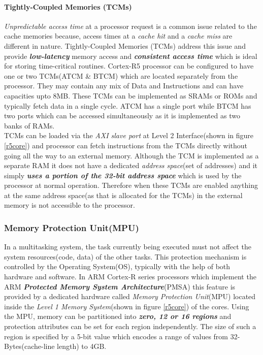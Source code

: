 \documentclass[a4paper,11pt]{article}
\begin{document}
\paragraph{Tightly-Coupled Memories (TCMs)}  \textit{Unpredictable access time} at a processor request is a common issue related to the cache memories because, access times at a \textit{cache hit} and a \textit{cache miss} are different in nature. Tightly-Coupled Memories (TCMs) address this issue and provide \textbf{\textit{low-latency}} memory access and \textbf{\textit{consistent access time}} which is ideal for storing time-critical routines. Cortex-R5 processor can be configured to have one or two TCMs(ATCM \& BTCM) which are located separately from the processor. They may contain any mix of Data and Instructions and can have capacities upto 8MB. These TCMs can be implemented as SRAMs or ROMs and typically fetch data in a single cycle. ATCM has a single port while BTCM has two ports which can be accessed simultaneously as it is implemented as two banks of RAMs.\\

TCMs can be loaded via the \textit{AXI slave port} at Level 2 Interface(shown in figure \ref{r5core}) and processor can fetch instructions from the TCMs directly without going all the way to an external memory. Although the TCM is implemented as a separate RAM it does not have a dedicated \textit{address space}(set of addresses) and it simply \textbf{\textit{uses a portion of the 32-bit address space}} which is used by the processor at normal operation. Therefore when these TCMs are enabled anything at the same address space(as that is allocated for the TCMs) in the external memory is not accessible to the processor.




\subsubsection{Memory Protection Unit(MPU)}

In a multitasking system, the task currently being executed must not affect the system resources(code, data) of the other tasks. This protection mechanism is controlled by the Operating System(OS), typically with the help of both hardware and software. In ARM Cortex-R series processors which implement the ARM \textit{\textbf{Protected Memory System Architecture}}(PMSA) this feature is provided by a dedicated hardware called \textit{Memory Protection Unit}(MPU) located inside the \textit{Level 1 Memory System}(shown in figure \ref{r5core}) of the cores. Using the MPU,  memory can be partitioned into \textbf{\textit{zero, 12 or 16 regions}} and protection attributes can be set for each region independently. The size of such a region is specified by a 5-bit value which encodes a range of values from 32-Bytes(cache-line length) to 4GB.
\end{document}
